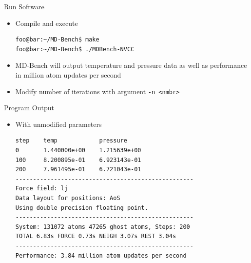 \documentclass[12pt,xcolor={rgb},t]{beamer}
\begin{document}
\begin{frame}[fragile]{Run Software}
    
    \lstset{breaklines=true, breakatwhitespace=true}

    \begin{itemize}
        \item Compile and execute
\begin{lstlisting}[basicstyle=\footnotesize, language=Bash, linewidth=10cm]
foo@bar:~/MD-Bench$ make
foo@bar:~/MD-Bench$ ./MDBench-NVCC
\end{lstlisting}
        \item MD-Bench will output temperature and pressure data as well as performance in million atom updates per second
        \item Modify number of iterations with argument \lstinline{-n <nmbr>}
    \end{itemize}

\end{frame}

\begin{frame}[fragile]{Program Output}
    
    \lstset{breaklines=true, breakatwhitespace=true}

    \begin{itemize}
        \item With unmodified parameters
\begin{lstlisting}[basicstyle=\footnotesize, linewidth=10cm]
step    temp            pressure
0       1.440000e+00    1.215639e+00
100     8.200895e-01    6.923143e-01
200     7.961495e-01    6.721043e-01
---------------------------------------------------
Force field: lj
Data layout for positions: AoS
Using double precision floating point.
---------------------------------------------------
System: 131072 atoms 47265 ghost atoms, Steps: 200
TOTAL 6.83s FORCE 0.73s NEIGH 3.07s REST 3.04s
---------------------------------------------------
Performance: 3.84 million atom updates per second
\end{lstlisting}
    \end{itemize}

\end{frame}
\end{document}
